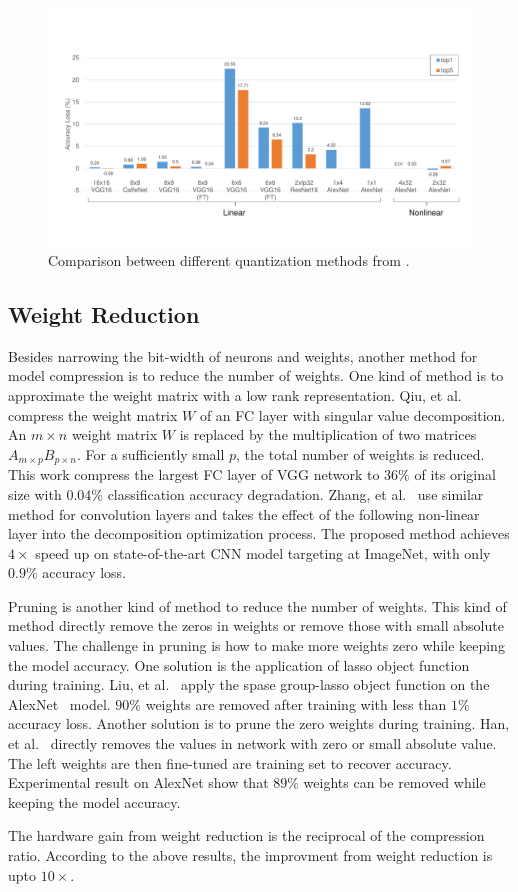 \begin{figure}[h]
    \centering
    \includegraphics[width=1.0\columnwidth]{fig/quantization.pdf}
    \caption{Comparison between different quantization methods from \cite{qiu2016going, guo2017angel, han2015deep, zhu2016trained, zhou2016dorefa, li2016ternary}.}
    \label{fig:quantization}
\end{figure}

\subsection{Weight Reduction}\label{sec:software:wr}
Besides narrowing the bit-width of neurons and weights, another method for model compression is to reduce the number of weights. One kind of method is to approximate the weight matrix with a low rank representation. Qiu, et al.~\cite{qiu2016going} compress the weight matrix $W$ of an FC layer with singular value decomposition. An $m\times n$ weight matrix $W$ is replaced by the multiplication of two matrices $A_{m\times p}B_{p\times n}$. For a sufficiently small $p$, the total number of weights is reduced. This work compress the largest FC layer of VGG network to $36\%$ of its original size with $0.04\%$ classification accuracy degradation. Zhang, et al.~\cite{zhang2015efficient} use similar method for convolution layers and takes the effect of the following non-linear layer into the decomposition optimization process. The proposed method achieves $4\times$ speed up on state-of-the-art CNN model targeting at ImageNet, with only $0.9\%$ accuracy loss.

Pruning is another kind of method to reduce the number of weights. This kind of method directly remove the zeros in weights or remove those with small absolute values. The challenge in pruning is how to make more weights zero while keeping the model accuracy. One solution is the application of lasso object function during training. Liu, et al.~\cite{liu2015sparse} apply the spase group-lasso object function on the AlexNet~\cite{krizhevsky2012imagenet} model. $90\%$ weights are removed after training with less than $1\%$ accuracy loss. Another solution is to prune the zero weights during training. Han, et al.~\cite{han2015deep} directly removes the values in network with zero or small absolute value. The left weights are then fine-tuned are training set to recover accuracy. Experimental result on AlexNet show that $89\%$ weights can be removed while keeping the model accuracy.

The hardware gain from weight reduction is the reciprocal of the compression ratio. According to the above results, the improvment from weight reduction is upto $10\times$.